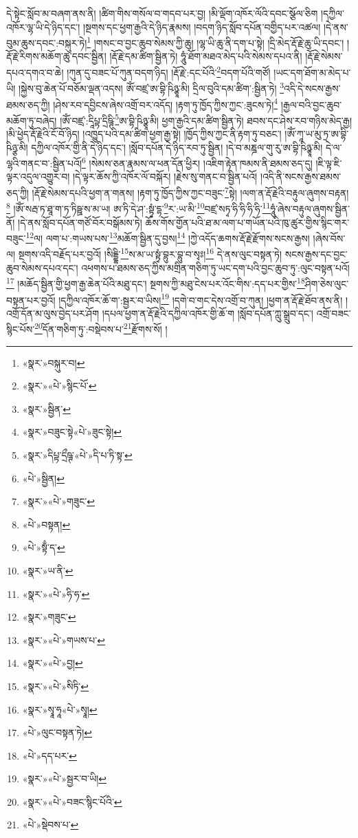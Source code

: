 དེ་སྟེང་སློབ་མ་བཞག་ནས་ནི། །ཚིག་གིས་གསོལ་བ་གདབ་པར་བྱ། །མི་ལྡོག་འཁོར་ལོའི་དབང་སྩོལ་ཅིག །དཀྱིལ་འཁོར་ལྷ་ཡི་དེ་ཉིད་དང་། །སྔགས་དང་ཕྱག་རྒྱའི་དེ་ཉིད་རྣམས། །བདག་ཉིད་སློབ་དཔོན་བགྱིད་པར་འཚལ། །དེ་ནས་བུམ་ཆུས་དབང་:བསྐུར་ཏེ།\footnote{«སྣར་»བསྐུར་བ།} །གསང་བ་བྱང་ཆུབ་སེམས་ཀྱི་ཆུ། །ལྷ་ཡི་ཆུ་ནི་དག་པ་སྟེ། །དྲི་མེད་རྡོ་རྗེ་ཆུ་ཡི་དབང་། །རྡོ་རྗེ་རིགས་མཆོག་ཆུ་དབང་སྦྱིན། །རྡོ་རྗེ་དམ་ཚིག་སྦྱིན་ཏེ། ཧཱུཾ་ཐོག་མཐའ་མེད་པའི་སེམས་དཔའ་ནི། །རྡོ་རྗེ་སེམས་དཔའ་དགའ་བ་ཆེ། །ཀུན་དུ་བཟང་པོ་ཀུན་བདག་ཉིད། །རྡོ་རྗེ་:དང་པོའི་\footnote{«སྣར་»«པེ་»སྙིང་པོ་}བདག་པོའི་གཙོ། །ཡང་དག་ཐོག་མ་མེད་པ་ཡི། །སྐྱེས་བུ་ཆེན་པོ་བཅོམ་ལྡན་འདས། ཨོཾ་བཛྲ་ཨ་བྷི་ཥིཉྩཱ་མི། དྲིལ་བུའི་དམ་ཚིག་:སྦྱིན་ཏེ། \footnote{«སྣར་»སྦྱིན་}འདི་དེ་སངས་རྒྱས་ཐམས་ཅད་ཀྱི། །ཤེས་རབ་དབྱིངས་ཞེས་འགྲོ་བར་འདོད། །རྟག་ཏུ་ཁྱོད་ཀྱིས་ཀྱང་:ཟུངས་ཏེ།\footnote{«སྣར་»བཟུང་སྟེ«པེ་»ཟུང་སྟེ།} །རྒྱལ་བའི་བྱང་ཆུབ་མཆོག་ཏུ་བཞེད། །ཨོཾ་བཛྲ་:དཱིཔྟ་དྲིཥྚི་\footnote{«སྣར་»དིཔྟ་དྲྀཥྚ་«པེ་»དི་པ་ཏི་སྟ་}ཨ་བྷི་ཥིཉྩཱ་མི། ཕྱག་རྒྱའི་དམ་ཚིག་སྦྱིན་ཏེ། ཐབས་དང་ཤེས་རབ་གཉིས་མེད་རྒྱ། །མི་ཕྱེད་རྡོ་རྗེའི་ངོ་བོ་ཉིད། །འཁྱུད་པའི་དམ་ཚིག་ཕྱག་རྒྱ་སྟེ། །ཁྱོད་ཀྱིས་ཀྱང་ནི་རྟག་ཏུ་བཅང་། །ཨོཾ་ཀཱ་ཡ་མུ་ཏྲ་ཨ་བྷི་ཥིཉྩ་མི། དཀྱིལ་འཁོར་གྱི་ནི་དེ་ཉིད་དང་། །སློབ་དཔོན་དེ་ཉིད་རབ་ཏུ་སྦྱིན། །དེ་བ་མཎྜལ་གུ་རུ་ཨ་བྷི་ཥིཉྩཱ་མི། དེ་ལ་ལྷའི་གནང་བ་:སྦྱིན་པའོ།\footnote{«པེ་»སྦྱིན།} །སེམས་ཅན་རྣམས་ལ་ཕན་དོན་ཕྱིར། །འཇིག་རྟེན་ཁམས་ནི་ཐམས་ཅད་དུ། །ཇི་ལྟ་ཇི་ལྟར་འདུལ་འགྱུར་བ། །དེ་ལྟར་ཆོས་ཀྱི་འཁོར་ལོ་བསྐོར། །རྗེས་སུ་གནང་བ་སྦྱིན་པའོ། །འདི་ནི་སངས་རྒྱས་ཐམས་ཅད་ཀྱི། །རྡོ་རྗེ་སེམས་དཔའི་ཕྱག་ན་གནས། །རྟག་ཏུ་ཁྱོད་ཀྱིས་ཀྱང་བཟུང་\footnote{«སྣར་»«པེ་»གཟུང་}སྟེ། །ལག་ན་རྡོ་རྗེའི་བརྟུལ་ཞུགས་བརྟན།\footnote{«པེ་»བསྟན།} །ཨོཾ་སརྦ་ཏ་ཐཱ་ག་ཏ་ཏིཥྛ་ས་མ་ཡ། ཨ་ཏི་དེ་ཤ་:སྟྭཾ་དྷ་\footnote{«པེ་»སྟྃ་ད་}ར་:ཡ་མི་\footnote{«སྣར་»ཡ་ནི་}བཛྲ་སཏྭ་ཧི་ཧི་ཧི་ཧི་\footnote{«སྣར་»«པེ་»ཧི་ཧ་}ཧཱུཾ་ཞེས་བརྟུལ་ཞུགས་སྦྱིན་ནོ། །དེ་ནས་སློབ་དཔོན་གཙོ་བོར་བསྒོམས་ཏེ། ཆོས་གོས་གྱོན་པའི་ཐ་མ་ལག་པ་གཡོན་པའི་ཁུ་ཚུར་གྱིས་སྙིང་གར་བཟུང་\footnote{«སྣར་»གཟུང་}ལ། ལག་པ་:གཡས་པས་\footnote{«སྣར་»«པེ་»གཡས་པ་}མཆོག་སྦྱིན་དུ་བྱས།\footnote{«སྣར་»«པེ་»བྱ།} །ཀྱེ་འདོད་ཆགས་རྡོ་རྗེ་རྫོགས་སངས་རྒྱས། །ཞེས་བོས་ལ། སྔགས་འདི་བརྗོད་པར་བྱའོ། །སིདྡྷི་\footnote{«སྣར་»«པེ་»སིཏི་}ས་མ་ཡ་སྟྭཾ་བྷུར་བྷུ་བ་སྭཿ།\footnote{«སྣར་»སྭཱ་ཧཱ«པེ་»སྭཱ།} དེ་ནས་ལུང་བསྟན་ཏེ། སངས་རྒྱས་དང་བྱང་ཆུབ་སེམས་དཔའ་དང་། འཕགས་པ་ཐམས་ཅད་ཀྱིས་མགྲིན་གཅིག་ཏུ་ཡང་དག་པའི་བྱང་ཆུབ་ཏུ་:ལུང་བསྟན་པའོ།\footnote{«པེ་»ལུང་བསྟན་ཏེ།} །མཆོད་སྦྱིན་གྱི་ཕྱག་རྒྱ་ཆེན་པོའི་མཐུ་དང་། སྔགས་ཀྱི་མཐུ་ངེས་པར་འོང་གིས་:དད་པར་གྱིས་\footnote{«པེ་»དད་པར་}ཤིག་ཅེས་ལུང་བསྟན་པར་བྱའོ། །དཀྱིལ་འཁོར་ཆོ་ག་:སྦྱར་བ་ཡིས།\footnote{«སྣར་»«པེ་»སྦྱར་བ་ཡི།} །དགེ་བ་གང་དེས་འགྲོ་བ་ཀུན། །ཕྱག་ན་རྡོ་རྗེ་ཐོབ་ནས་ནི། །འགྲོ་དོན་མ་ལུས་བྱེད་པར་ཤོག །དཔལ་ཕྱག་ན་རྡོ་རྗེའི་དཀྱིལ་འཁོར་གྱི་ཆོ་ག །སློབ་དཔོན་ཀླུ་སྒྲུབ་དང་། འགྲོ་བཟང་སྙིང་པོས་\footnote{«སྣར་»«པེ་»བཟང་སྙིང་པོའི་}དོན་གཅིག་ཏུ་:བསྡེབས་པ་\footnote{«པེ་»སྡེབས་པ་}རྫོགས་སོ། ། 